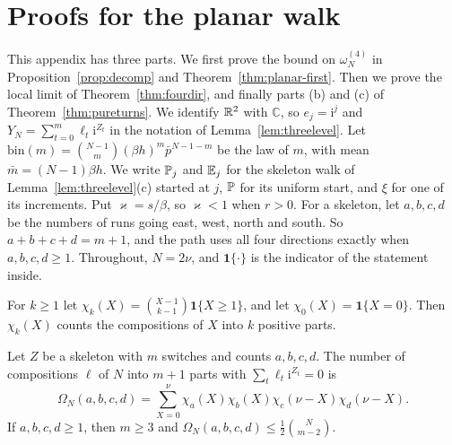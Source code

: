 \section{Proofs for the planar walk}\label{app:planar}

This appendix has three parts. We first prove the bound on $\omega^{(4)}_N$ in
Proposition~\ref{prop:decomp} and Theorem~\ref{thm:planar-first}. Then we prove the local limit of
Theorem~\ref{thm:fourdir}, and finally parts (b) and (c) of Theorem~\ref{thm:pureturns}. We identify $\mathbb{R}^2$ with $\mathbb C$, so $e_j=\mathrm i^j$ and
$Y_N=\sum_{t=0}^m\ell_t\mathrm i^{Z_t}$ in the notation of Lemma~\ref{lem:threelevel}. Let
$\mathrm{bin}(m)=\binom{N-1}m(\beta h)^m\bar p^{N-1-m}$ be the law of $m$, with mean
$\bar m=(N-1)\beta h$. We write $\mathbb{P}_j$ and $\mathbb{E}_j$ for the skeleton walk of
Lemma~\ref{lem:threelevel}(c) started at $j$, $\mathbb{P}$ for its uniform start, and $\xi$ for one of
its increments. Put $\varkappa=s/\beta$, so $\varkappa<1$ when $r>0$. For a skeleton, let $a,b,c,d$
be the numbers of runs going east, west, north and south. So $a+b+c+d=m+1$, and the path uses all four
directions exactly when $a,b,c,d\ge1$. Throughout, $N=2\nu$, and $\mathbf 1\{\cdot\}$ is the indicator of
the statement inside.

For $k\ge1$ let $\chi_k(X)=\binom{X-1}{k-1}\mathbf 1\{X\ge1\}$, and let $\chi_0(X)=\mathbf 1\{X=0\}$. Then $\chi_k(X)$
counts the compositions of $X$ into $k$ positive parts.

\begin{lemma}\label{lem:returncount}
Let $Z$ be a skeleton with $m$ switches and counts $a,b,c,d$. The number of compositions $\ell$ of
$N$ into $m+1$ parts with $\sum_t\ell_t\mathrm i^{Z_t}=0$ is
\[
 \Omega_N(a,b,c,d)=\sum_{X=0}^{\nu}\chi_a(X)\chi_b(X)
 \chi_c(\nu-X)\chi_d(\nu-X).
\]
If $a,b,c,d\ge1$, then $m\ge3$ and $\Omega_N(a,b,c,d)\le\frac12\binom N{m-2}$.
\end{lemma}

